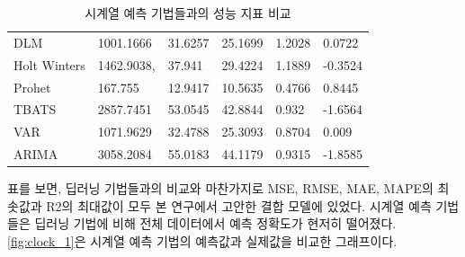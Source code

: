 \documentclass[11pt]{report}
\begin{document}
\begin{table}[H]
\begin{center}
\begin{tabular}{@{}llllll@{}}
		DLM                                & 1001.1666                                            & 31.6257                                             & 25.1699                                             & 1.2028                                              & 0.0722                                              \\
		Holt Winters                       & 1462.9038,                                           & 37.941                                              & 29.4224                                             & 1.1889                                              & -0.3524                                             \\
		Prohet                             & 167.755                                              & 12.9417                                             & 10.5635                                             & 0.4766                                              & 0.8445                                              \\
		TBATS                              & 2857.7451                                            & 53.0545                                             & 42.8844                                             & 0.932                                               & -1.6564                                             \\
		VAR                                & 1071.9629                                            & 32.4788                                             & 25.3093                                             & 0.8704                                              & 0.009                                               \\
		ARIMA                              & 3058.2084                                            & 55.0183                                             & 44.1179                                             & 0.9315                                              & -1.8585                                             \\ \bottomrule
	\end{tabular}
	\end{center}
	\caption{시계열 예측 기법들과의 성능 지표 비교}
	\label{tab:clock_eval}
\end{table}

표를 보면, 딥러닝 기법들과의 비교와 마찬가지로 MSE, RMSE, MAE, MAPE의 최솟값과 R2의 최대값이 모두 본 연구에서 고안한 결합 모델에 있었다. 
시계열 예측 기법들은 딥러닝 기법에 비해 전체 데이터에서 예측 정확도가 현저히 떨어졌다. 
\autoref{fig:clock_1}은 시계열 예측 기법의 예측값과 실제값을 비교한 그래프이다. 
\end{document}
